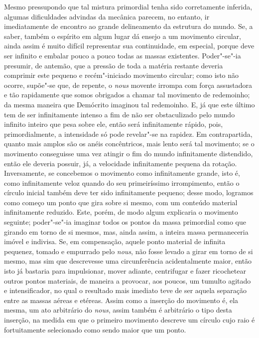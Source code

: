 Mesmo pressupondo que tal mistura primordial tenha sido corretamente inferida,
algumas dificuldades advindas da mecânica parecem, no entanto, ir
imediatamente de encontro ao grande delineamento da estrutura do mundo. Se, a
saber, também o espírito em algum lugar dá ensejo a um movimento circular,
ainda assim é muito difícil representar sua continuidade, em especial, porque
deve ser infinito e embalar pouco a pouco todas as massas existentes.
Poder"-se"-ia presumir, de antemão, que a pressão de toda a matéria restante
deveria comprimir este pequeno e recém"-iniciado movimento circular; como
isto não ocorre, supõe"-se que, de repente, o \textit{nous} movente irrompa
com força assustadora e tão rapidamente que somos obrigados a chamar tal
movimento de redemoinho; da mesma maneira que Demócrito imaginou tal
redemoinho. E, já que este último tem de ser infinitamente intenso a fim de
não ser obstaculizado pelo mundo infinito inteiro que pesa sobre ele, então
será infinitamente rápido, pois, primordialmente, a intensidade só pode
revelar"-se na rapidez. Em contrapartida, quanto mais amplos são os anéis
concêntricos, mais lento será tal movimento; se o movimento conseguisse uma
vez atingir o fim do mundo infinitamente distendido, então ele deveria
possuir, já, a velocidade infinitamente pequena da rotação. Inversamente, se
concebemos o movimento como infinitamente grande, isto é, como infinitamente
veloz quando do seu primeiríssimo irrompimento, então o círculo inicial
também deve ter sido infinitamente pequeno; desse modo, logramos como começo
um ponto que gira sobre si mesmo, com um conteúdo material infinitamente
reduzido. Este, porém, de modo algum explicaria o movimento seguinte;
poder"-se"-ia imaginar todos os pontos da massa primordial como que girando
em torno de si mesmos, mas, ainda assim, a inteira massa permaneceria imóvel
e indivisa. Se, em compensação, aquele ponto material de infinita pequenez,
tomado e empurrado pelo \textit{nous}, não fosse levado a girar em torno de
si mesmo, mas sim que descrevesse uma circunferência acidentalmente maior,
então isto já bastaria para impulsionar, mover adiante, centrifugar e fazer
ricochetear outros pontos materiais, de maneira a provocar, aos poucos, um
tumulto agitado e intensificador, no qual o resultado mais imediato teve de
ser aquela separação entre as massas aéreas e etéreas. Assim como a inserção
do movimento é, ela mesma, um ato arbitrário do \textit{nous}, assim também é
arbitrário o tipo desta inserção, na medida em que o primeiro movimento
descreve um círculo cujo raio é fortuitamente selecionado como sendo maior
que um ponto.

